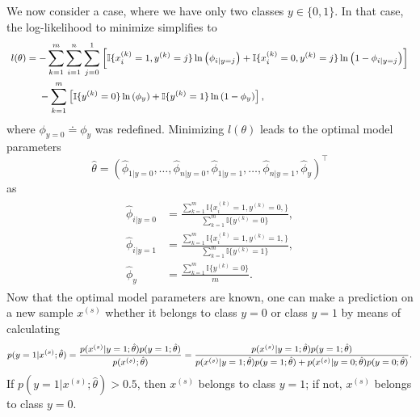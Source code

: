 \documentclass[a4paper,11pt]{article}
\numberwithin{equation}{section}
\begin{document}
{We now consider a case, where we have only two classes $y\in\{0,1\}$. In that case, the log-likelihood to minimize simplifies to \begin{align}\footnotesize\begin{aligned}
		l(\theta) &= -\sum_{k=1}^{m}\sum_{i=1}^{n}\sum_{j=0}^{1}\left[ \mathbb{I}\{x_i^{(k)}=1,y^{(k)}=j\}\ln\left(\phi_{i|y=j}\right)+ \mathbb{I}\{x_i^{(k)}=0,y^{(k)}=j\}\ln\left(1-\phi_{i|y=j}\right)\right] \\
		&\quad\ -\sum_{k=1}^{m}\left[\mathbb{I}\{y^{(k)}=0\}\ln\left(\phi_y\right) + \mathbb{I}\{y^{(k)}=1\}\ln\left(1-\phi_y\right)\right],
\end{aligned}\end{align} where $\phi_{y=0} \doteq \phi_y$ was redefined. Minimizing $l(\theta)$ leads to the optimal model parameters $$\hat{\theta} = (\hat{\phi}_{1|y=0},\dots,\hat{\phi}_{n|y=0},\hat{\phi}_{1|y=1},\dots,\hat{\phi}_{n|y=1},\hat{\phi}_y)^\top$$ as \begin{align}
\begin{aligned}
	\hat{\phi}_{i|y=0} &= \frac{\sum_{k=1}^m \mathbb{I}\{x_i^{(k)}= 1, y^{(k)}=0,\}}{\sum_{k=1}^{m}\mathbb{I}\{y^{(k)}=0\}}, \\
	\hat{\phi}_{i|y=1} &= \frac{\sum_{k=1}^m \mathbb{I}\{x_i^{(k)}= 1, y^{(k)}=1,\}}{\sum_{k=1}^{m}\mathbb{I}\{y^{(k)}=1\}}, \\
	\hat{\phi}_y &= \frac{\sum_{k=1}^{m}\mathbb{I}\{y^{(k)}=0\}}{m}.
\end{aligned}
\end{align} Now that the optimal model parameters are known, one can make a prediction on a new sample $x^{(s)}$ whether it belongs to class $y=0$ or class $y=1$ by means of calculating \begin{align}\footnotesize\begin{aligned}
p(y=1|x^{(s)};\hat{\theta}) = \frac{p(x^{(s)}|y=1;\hat{\theta})p(y=1;\hat{\theta})}{p(x^{(s)};\hat{\theta})}= \frac{p(x^{(s)}|y=1;\hat{\theta})p(y=1;\hat{\theta})}{p(x^{(s)}|y=1;\hat{\theta})p(y=1;\hat{\theta}) + p(x^{(s)}|y=0;\hat{\theta})p(y=0;\hat{\theta})}.
\end{aligned}\end{align} If $p(y=1|x^{(s)};\hat{\theta}) > 0.5$, then $x^{(s)}$ belongs to class $y=1$; if not, $x^{(s)}$ belongs to class $y=0$.
}
\end{document}
